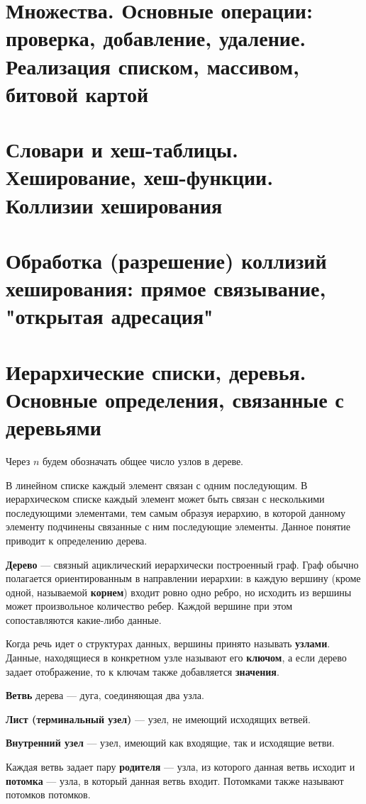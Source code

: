 \newcommand{\asgn}{\gets\,}
\section{Множества. Основные операции: проверка, добавление, удаление. Реализация списком, массивом, битовой картой}
\section{Словари и хеш-таблицы. Хеширование, хеш-функции. Коллизии хеширования}
\section{Обработка (разрешение) коллизий хеширования: прямое связывание, "открытая адресация"}
\section{Иерархические списки, деревья. Основные определения, связанные с деревьями}
Через $n$ будем обозначать общее число узлов в дереве.

В линейном списке каждый элемент связан с одним последующим. В иерархическом списке
каждый элемент может быть связан с несколькими последующими элементами, тем самым
образуя иерархию, в которой данному элементу подчинены связанные с ним последующие
элементы. Данное понятие приводит к определению дерева.

\textbf{Дерево} --- связный ациклический иерархически построенный граф. Граф обычно
полагается ориентированным в направлении иерархии: в каждую вершину (кроме одной,
называемой \textbf{корнем}) входит ровно одно ребро, но исходить из вершины может
произвольное количество ребер. Каждой вершине при этом сопоставляются какие-либо данные.

Когда речь идет о структурах данных, вершины принято называть \textbf{узлами}.
Данные, находящиеся в конкретном узле называют его \textbf{ключом}, а если дерево задает
отображение, то к ключам также добавляется \textbf{значения}.

\textbf{Ветвь} дерева --- дуга, соединяющая два узла. 

\textbf{Лист (терминальный узел)} --- узел, не имеющий исходящих ветвей.

\textbf{Внутренний узел} --- узел, имеющий как входящие, так и исходящие ветви.

Каждая ветвь задает пару \textbf{родителя} --- узла, из которого данная ветвь исходит
и \textbf{потомка} --- узла, в который данная ветвь входит. Потомками также называют
потомков потомков.

